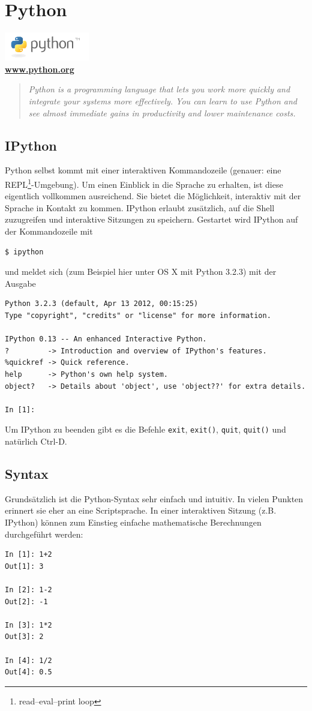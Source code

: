 \chapter{Python}
\begin{center}
    \includegraphics[width=140px]{img/python.png} \\
    \textbf{\href{http://python.org}{www.python.org}}
\end{center}
\begin{quote}
    \textit{Python is a programming language that lets you work more quickly and integrate your systems more effectively. You can learn to use Python and see almost immediate gains in productivity and lower maintenance costs.}
\end{quote}

\section{IPython}
Python selbst kommt mit einer interaktiven Kommandozeile (genauer: eine REPL\footnote{ read–eval–print loop}-Umgebung). Um einen Einblick in die Sprache zu erhalten, ist diese eigentlich vollkommen ausreichend. Sie bietet die Möglichkeit, interaktiv mit der Sprache in Kontakt zu kommen. IPython erlaubt zusätzlich, auf die Shell zuzugreifen und interaktive Sitzungen zu speichern.
Gestartet wird IPython auf der Kommandozeile mit
\begin{verbatim}
$ ipython
\end{verbatim}
und meldet sich (zum Beispiel hier unter OS X mit Python 3.2.3) mit der Ausgabe
\begin{verbatim}
Python 3.2.3 (default, Apr 13 2012, 00:15:25) 
Type "copyright", "credits" or "license" for more information.

IPython 0.13 -- An enhanced Interactive Python.
?         -> Introduction and overview of IPython's features.
%quickref -> Quick reference.
help      -> Python's own help system.
object?   -> Details about 'object', use 'object??' for extra details.

In [1]: 
\end{verbatim}
Um IPython zu beenden gibt es die Befehle \texttt{exit}, \texttt{exit()}, \texttt{quit}, \texttt{quit()} und natürlich Ctrl-D.

\section{Syntax}
Grundsätzlich ist die Python-Syntax sehr einfach und intuitiv. In vielen Punkten erinnert sie eher an eine Scriptsprache. In einer interaktiven Sitzung (z.B. IPython) können zum Einstieg einfache mathematische Berechnungen durchgeführt werden:
\begin{verbatim}
In [1]: 1+2
Out[1]: 3

In [2]: 1-2
Out[2]: -1

In [3]: 1*2
Out[3]: 2

In [4]: 1/2
Out[4]: 0.5
\end{verbatim}

